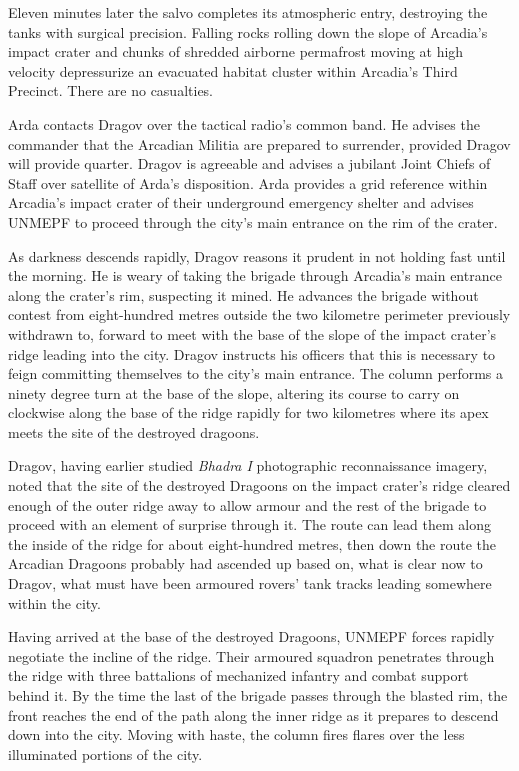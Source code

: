 Eleven minutes later the salvo completes its atmospheric entry, destroying the tanks with surgical precision. Falling rocks rolling down the slope of Arcadia's impact crater and chunks of shredded airborne permafrost moving at high velocity depressurize an evacuated habitat cluster within Arcadia's Third Precinct. There are no casualties.

Arda contacts Dragov over the tactical radio's common band. He advises the commander that the Arcadian Militia are prepared to surrender, provided Dragov will provide quarter. Dragov is agreeable and advises a jubilant Joint Chiefs of Staff over satellite of Arda's disposition. Arda provides a grid reference within Arcadia's impact crater of their underground emergency shelter and advises UNMEPF to proceed through the city's main entrance on the rim of the crater. 

As darkness descends rapidly, Dragov reasons it prudent in not holding fast until the morning. He is weary of taking the brigade through Arcadia's main entrance along the crater's rim, suspecting it mined. He advances the brigade without contest from eight-hundred metres outside the two kilometre perimeter previously withdrawn to, forward to meet with the base of the slope of the impact crater's ridge leading into the city. Dragov instructs his officers that this is necessary to feign committing themselves to the city's main entrance. The column performs a ninety degree turn at the base of the slope, altering its course to carry on clockwise along the base of the ridge rapidly for two kilometres where its apex meets the site of the destroyed dragoons.

Dragov, having earlier studied {\it Bhadra I} photographic reconnaissance imagery, noted that the site of the destroyed Dragoons on the impact crater's ridge cleared enough of the outer ridge away to allow armour and the rest of the brigade to proceed with an element of surprise through it. The route can lead them along the inside of the ridge for about eight-hundred metres, then down the route the Arcadian Dragoons probably had ascended up based on, what is clear now to Dragov, what must have been armoured rovers' tank tracks leading somewhere within the city.

Having arrived at the base of the destroyed Dragoons, UNMEPF forces rapidly negotiate the incline of the ridge. Their armoured squadron penetrates through the ridge with three battalions of mechanized infantry and combat support behind it. By the time the last of the brigade passes through the blasted rim, the front reaches the end of the path along the inner ridge as it prepares to descend down into the city. Moving with haste, the column fires flares over the less illuminated portions of the city. 

